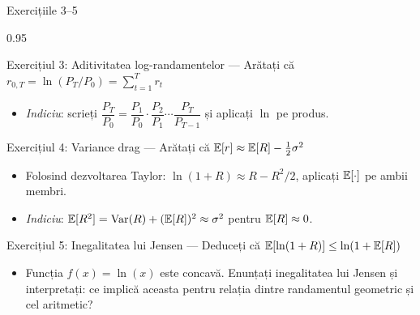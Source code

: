 \documentclass[9pt, aspectratio=169, t]{beamer}
\begin{document}
\begin{frame}[shrink=7]{Exercițiile 3--5}
    \begin{cminipage}{0.95\textwidth}
    \begin{block}{Exercițiul 3: Aditivitatea log-randamentelor --- Arătați că $r_{0,T} = \ln(P_T/P_0) = \sum_{t=1}^{T} r_t$}
    \begin{itemize}\setlength{\itemsep}{0pt}
        \item \textit{Indiciu}: scrieți $\dfrac{P_T}{P_0} = \dfrac{P_1}{P_0} \cdot \dfrac{P_2}{P_1} \cdots \dfrac{P_T}{P_{T-1}}$ și aplicați $\ln$ pe produs.
    \end{itemize}
    \end{block}
    \vspace{0.2cm}
    \begin{block}{Exercițiul 4: Variance drag --- Arătați că $\mathbb{E}[r] \approx \mathbb{E}[R] - \frac{1}{2}\sigma^2$}
    \begin{itemize}\setlength{\itemsep}{0pt}
        \item Folosind dezvoltarea Taylor: $\ln(1+R) \approx R - R^2/2$, aplicați $\mathbb{E}[\cdot]$ pe ambii membri.
        \item \textit{Indiciu}: $\mathbb{E}[R^2] = \text{Var}(R) + (\mathbb{E}[R])^2 \approx \sigma^2$ pentru $\mathbb{E}[R] \approx 0$.
    \end{itemize}
    \end{block}
    \vspace{0.2cm}
    \begin{exampleblock}{Exercițiul 5: Inegalitatea lui Jensen --- Deduceți că $\mathbb{E}[\ln(1+R)] \leq \ln(1 + \mathbb{E}[R])$}
    \begin{itemize}\setlength{\itemsep}{0pt}
        \item Funcția $f(x) = \ln(x)$ este concavă. Enunțați inegalitatea lui Jensen și interpretați: ce implică aceasta pentru relația dintre randamentul geometric și cel aritmetic?
    \end{itemize}
    \end{exampleblock}
    \end{cminipage}
\end{frame}
\end{document}
